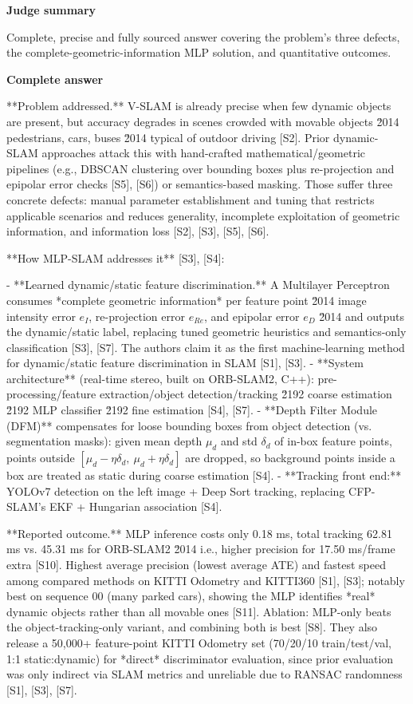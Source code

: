 \documentclass[10pt]{article}
\begin{document}
\textbf{Judge summary}
\begin{EvidenceText}
Complete, precise and fully sourced answer covering the problem's three defects, the complete-geometric-information MLP solution, and quantitative outcomes.
\end{EvidenceText}

\textbf{Complete answer}
\begin{AnswerText}
**Problem addressed.** V-SLAM is already precise when few dynamic objects are present, but accuracy degrades in scenes crowded with movable objects \u2014 pedestrians, cars, buses \u2014 typical of outdoor driving [S2]. Prior dynamic-SLAM approaches attack this with hand-crafted mathematical/geometric pipelines (e.g., DBSCAN clustering over bounding boxes plus re-projection and epipolar error checks [S5], [S6]) or semantics-based masking. Those suffer three concrete defects: manual parameter establishment and tuning that restricts applicable scenarios and reduces generality, incomplete exploitation of geometric information, and information loss [S2], [S3], [S5], [S6].

**How MLP-SLAM addresses it** [S3], [S4]:

- **Learned dynamic/static feature discrimination.** A Multilayer Perceptron consumes *complete geometric information* per feature point \u2014 image intensity error $e_I$, re-projection error $e_{Re}$, and epipolar error $e_D$ \u2014 and outputs the dynamic/static label, replacing tuned geometric heuristics and semantics-only classification [S3], [S7]. The authors claim it as the first machine-learning method for dynamic/static feature discrimination in SLAM [S1], [S3].
- **System architecture** (real-time stereo, built on ORB-SLAM2, C++): pre-processing/feature extraction/object detection/tracking \u2192 coarse estimation \u2192 MLP classifier \u2192 fine estimation [S4], [S7].
- **Depth Filter Module (DFM)** compensates for loose bounding boxes from object detection (vs. segmentation masks): given mean depth $\mu_d$ and std $\delta_d$ of in-box feature points, points outside $[\mu_d-\eta\delta_d,\ \mu_d+\eta\delta_d]$ are dropped, so background points inside a box are treated as static during coarse estimation [S4].
- **Tracking front end:** YOLOv7 detection on the left image + Deep Sort tracking, replacing CFP-SLAM's EKF + Hungarian association [S4].

**Reported outcome.** MLP inference costs only 0.18 ms, total tracking 62.81 ms vs. 45.31 ms for ORB-SLAM2 \u2014 i.e., higher precision for 17.50 ms/frame extra [S10]. Highest average precision (lowest average ATE) and fastest speed among compared methods on KITTI Odometry and KITTI360 [S1], [S3]; notably best on sequence 00 (many parked cars), showing the MLP identifies *real* dynamic objects rather than all movable ones [S11]. Ablation: MLP-only beats the object-tracking-only variant, and combining both is best [S8]. They also release a 50,000+ feature-point KITTI Odometry set (70/20/10 train/test/val, 1:1 static:dynamic) for *direct* discriminator evaluation, since prior evaluation was only indirect via SLAM metrics and unreliable due to RANSAC randomness [S1], [S3], [S7].
\end{AnswerText}
\end{document}
